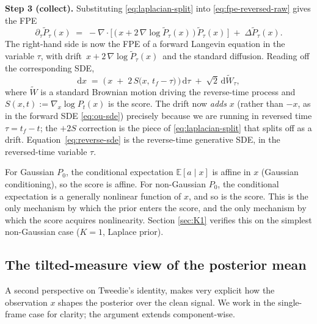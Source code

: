 \documentclass[11pt]{article}
\theoremstyle{definition}
\newcommand{\E}{\mathbb{E}}
\begin{document}
\begin{derivation}
\textbf{Step 3 (collect).} Substituting \eqref{eq:laplacian-split}
into \eqref{eq:fpe-reversed-raw} gives the FPE
\begin{equation}\label{eq:fpe-backward}
    \partial_\tau \widetilde P_\tau(x)
    \;=\;
    -\nabla \cdot \!\bigl[\, \bigl(\, x +
        2\, \nabla \log \widetilde P_\tau(x) \,\bigr)\,
        \widetilde P_\tau(x) \,\bigr]
    \;+\;
    \Delta \widetilde P_\tau(x).
\end{equation}
The right-hand side is now the FPE of a forward Langevin equation in
the variable \(\tau\), with drift
\(\,x + 2\, \nabla \log \widetilde P_\tau(x)\,\) and the standard
diffusion. Reading off the corresponding SDE,
\begin{equation}\label{eq:reverse-sde}
    \mathrm d x
    \;=\;
    \bigl(\, x \;+\; 2\, S\!\bigl(x,\, t_f - \tau\bigr) \,\bigr)\,
        \mathrm d \tau
    \;+\;
    \sqrt{2}\,\mathrm d\widetilde W_\tau,
\end{equation}
where \(\widetilde W\) is a standard Brownian motion driving the
reverse-time process and \(S(x, t) := \nabla_x \log P_t(x)\) is the
score. The drift now \emph{adds} \(x\) (rather than \(-x\), as in the
forward SDE \eqref{eq:ou-sde}) precisely because we are running in
reversed time \(\tau = t_f - t\); the \(+2 S\) correction is the
piece of \eqref{eq:laplacian-split} that splits off as a drift.
Equation~\eqref{eq:reverse-sde} is the reverse-time generative SDE,
in the reversed-time variable \(\tau\).
\end{derivation}

\begin{intuition}
For Gaussian \(P_0\), the conditional expectation
\(\E[a \mid x]\) is affine in \(x\) (Gaussian conditioning), so the
score is affine. For non-Gaussian \(P_0\), the conditional expectation
is a generally nonlinear function of \(x\), and so is the score. This
is the only mechanism by which the prior enters the score, and the
only mechanism by which the score acquires nonlinearity. Section
\ref{sec:K1} verifies this on the simplest non-Gaussian case
(\(K = 1\), Laplace prior).
\end{intuition}

\subsection{The tilted-measure view of the posterior
mean}\label{sec:tilted-measure}

A second perspective on Tweedie's identity, makes very explicit how the
observation \(x\) shapes the posterior over the clean signal. We work
in the single-frame case for clarity; the argument extends
component-wise.
\end{document}
